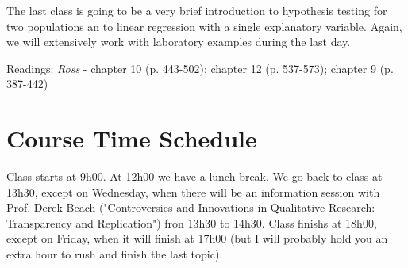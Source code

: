 \documentclass[a4paper,11pt]{article}
\begin{document}
The last class is going to be a very brief introduction to hypothesis testing for two populations an to linear regression with a single explanatory variable. Again, we will extensively work with laboratory examples during the last day.

Readings: \emph{Ross} - chapter 10 (p. 443-502); chapter 12 (p. 537-573); chapter 9 (p. 387-442)

\section{Course Time Schedule}

Class starts at 9h00. At 12h00 we have a lunch break. We go back to class at 13h30, except on Wednesday, when there will be an information session with Prof. Derek Beach ("Controversies and Innovations in Qualitative Research: Transparency and Replication") fron 13h30 to 14h30. Class finishs at 18h00, except on Friday, when it will finish at 17h00 (but I will probably hold you an extra hour to rush and finish the last topic).
\end{document}
